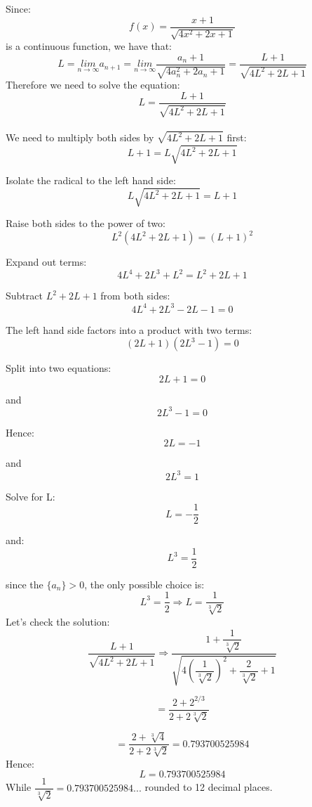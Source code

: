 \documentclass[12pt, letterpaper, oneside]{report}
\begin{document}
Since: 
\begin{equation}
f(x)=\dfrac{ x + 1 }{ \sqrt{ 4 x^{2} + 2 x + 1} }
\end{equation}
is a continuous function, we have that:
\begin{equation}
L=\underset{n\to \infty }{lim} a_{n+1}=\underset{n\to \infty }{lim}\dfrac{ a_{n}+1 }{ \sqrt{4a_{n}^{2}+2a_{n}+1} } = \dfrac{ L+1 }{ \sqrt{4L^{2}+2L+1} }
\end{equation}
\newpage
Therefore we need to solve the equation:
\\
\begin{equation}\label{l-eq}
L = \dfrac{ L + 1 }{ \sqrt{ 4 L^{ 2 } + 2 L + 1 } }
\end{equation}
\\
We need to multiply both sides by $\sqrt{4 L^2 + 2 L + 1}$ first:
\[ L + 1 = L \sqrt{4 L^2 + 2 L + 1}\] 

Isolate the radical to the left hand side:
\[L \sqrt{4 L^2 + 2 L + 1} = L + 1 \]

Raise both sides to the power of two:
\[L^2 (4 L^2 + 2 L + 1) = (L + 1)^2 \]

Expand out terms:
\[ 4 L^4 + 2 L^3 + L^2 = L^2 + 2 L + 1 \]

Subtract $L^2 + 2 L + 1$ from both sides:
\[ 4 L^4 + 2 L^3 - 2 L - 1 = 0 \]

The left hand side factors into a product with two terms:
\[ (2 L + 1) (2 L^3 - 1) = 0 \]

Split into two equations:
\[ 2 L + 1 = 0 \]

and
\[ 2 L^3 - 1 = 0 \]

Hence:
\[ 2 L = -1 \]

and
\[ 2 L^3 = 1 \]

Solve for L:
\[ L = -\dfrac{1}{2} \]

and:
\[ L^3 = \dfrac{1}{2} \]

since the $\{a_{n}\}>0$, the only possible choice is:
\[  L^3 = \dfrac{1}{2} \Rightarrow L = \frac{1}{\sqrt[3]{2}} \]
\newpage
\vspace{10mm}
Let's check the solution:
\[
\dfrac{ L + 1 } { \sqrt{ 4 L^2 + 2 L + 1} } \Rightarrow \dfrac{ 1 + \dfrac{ 1 }{ \sqrt[ 3 ]{ 2 } } } { \sqrt{ 4 \left( \dfrac{1}{ \sqrt[ 3 ]{ 2 } } \right)^2 + \dfrac{2}{\sqrt[ 3 ]{ 2 } } + 1 } }
\]

\[
= \dfrac{ 2 + 2^{ 2/3 } }{ 2 + 2\sqrt[ 3 ]{ 2 } }
\]

\[
= \dfrac{ 2 + \sqrt[3]{ 4 } }{ 2 + 2\sqrt[ 3 ]{ 2 } } = 0.793700525984
\]
\vspace{5mm}
Hence:
\[
L = 0.793700525984
\]
\vspace{5mm}
While $ \dfrac{1}{\sqrt[ 3 ]{ 2 } } = 0.793700525984... $ rounded to 12 decimal places.
\end{document}
